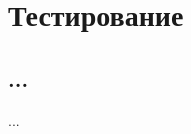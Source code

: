 \documentclass[../document.tex]{subfiles}
\begin{document}
    \section{Тестирование}
        \subsection{...}
            \par ...
\end{document}
